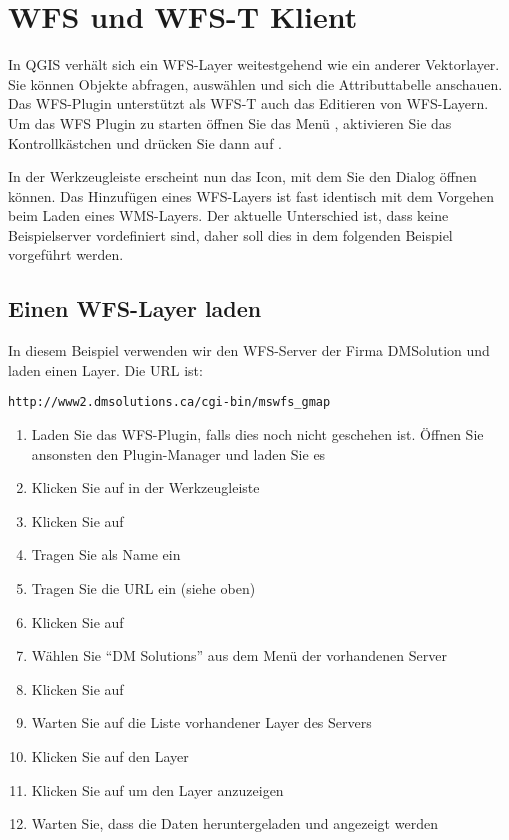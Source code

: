 \section{WFS und WFS-T Klient}\label{sec:ogc-wfs}

In QGIS verhält sich ein WFS-Layer weitestgehend wie ein anderer Vektorlayer.
Sie können Objekte abfragen, auswählen und sich die Attributtabelle
anschauen. Das WFS-Plugin unterstützt als WFS-T auch das Editieren von
WFS-Layern. Um das WFS Plugin zu starten öffnen Sie das Menü 
 \arrow {}, aktivieren Sie das Kontrollkästchen  und
drücken Sie dann auf .

In der Werkzeugleiste erscheint nun das
 Icon, mit dem Sie den
Dialog  öffnen können. Das Hinzufügen
eines WFS-Layers ist fast identisch mit dem Vorgehen beim Laden eines
WMS-Layers. Der aktuelle Unterschied ist, dass keine Beispielserver
vordefiniert sind, daher soll dies in dem folgenden Beispiel vorgeführt
werden.

\subsection{Einen WFS-Layer laden}

In diesem Beispiel verwenden wir den WFS-Server der Firma DMSolution und
laden einen
Layer. Die URL ist:
\begin{verbatim}
http://www2.dmsolutions.ca/cgi-bin/mswfs_gmap
\end{verbatim}

\begin{enumerate}
  \item Laden Sie das WFS-Plugin, falls dies noch nicht geschehen ist. Öffnen
Sie ansonsten den Plugin-Manager und laden Sie es
  \item Klicken Sie auf  in der
Werkzeugleiste
  \item Klicken Sie auf 
  \item Tragen Sie  als Name ein
  \item Tragen Sie die URL ein (siehe oben)
  \item Klicken Sie auf 
  \item Wählen Sie ``DM Solutions'' aus dem Menü der vorhandenen Server
  \item Klicken Sie auf 
  \item Warten Sie auf die Liste vorhandener Layer des Servers
  \item Klicken Sie auf den Layer 
  \item Klicken Sie auf  um den Layer anzuzeigen
  \item Warten Sie, dass die Daten heruntergeladen und angezeigt werden
\end{enumerate}

